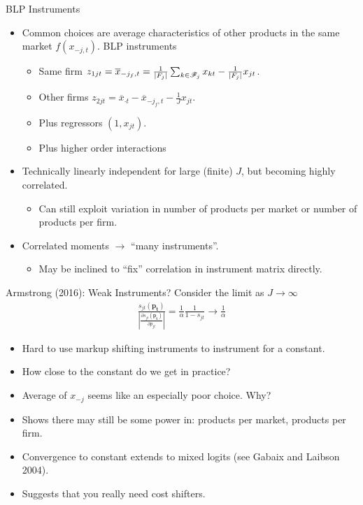 \documentclass[aspectratio=169,10pt]{beamer}
\begin{document}
\begin{frame}{BLP Instruments}
\begin{itemize}
\item Common choices are average characteristics of other products in the same market $f(x_{-j,t})$. \alert{BLP instruments}
\begin{itemize}
\item Same firm $z_{1jt} = \overline{x}_{-j_f,t} = \frac{1}{\left\vert{F_j}\right\vert}  \sum_{k \in \mathscr{F}_j} x_{kt} - \frac{1}{\left\vert{F_j}\right\vert} x_{jt}$.
\item Other firms $z_{2jt}=\overline{x}_{\cdot t} - \overline{x}_{-j_f,t} - \frac{1}{J} x_{jt}$.
\item Plus regressors $(1, x_{jt})$.
\item Plus higher order interactions 
\end{itemize}
\item Technically linearly independent for large (finite) $J$, but becoming highly correlated.
\begin{itemize}
\item Can still exploit variation in number of products per market or number of products per firm.
\end{itemize}
\item Correlated moments $\rightarrow$ ``many instruments''.
\begin{itemize}
\item May be inclined to ``fix'' correlation in instrument matrix directly.
\end{itemize}
\end{itemize}
\end{frame}


\begin{frame}{Armstrong (2016): Weak Instruments?}
Consider the limit as $J \rightarrow \infty$
\begin{eqnarray*}
\frac{s_{jt}(\symbf{p_t})}{\left|\frac{\partial s_{jt}(\symbf{p_t})}{\partial p_{jt}}\right|} = \frac{1}{\alpha} \frac{1}{1-s_{jt}} \rightarrow \frac{1}{\alpha}
\end{eqnarray*}
\begin{itemize}
\item Hard to use markup shifting instruments to instrument for a constant.
\item How close to the constant do we get in practice?
\item Average of $x_{-j}$ seems like an especially poor choice. Why?
\item Shows there may still be some power in: products per market, products per firm.
\item Convergence to constant extends to mixed logits (see Gabaix and Laibson 2004).
\item Suggests that you really need cost shifters.
\end{itemize}
\end{frame}
\end{document}
